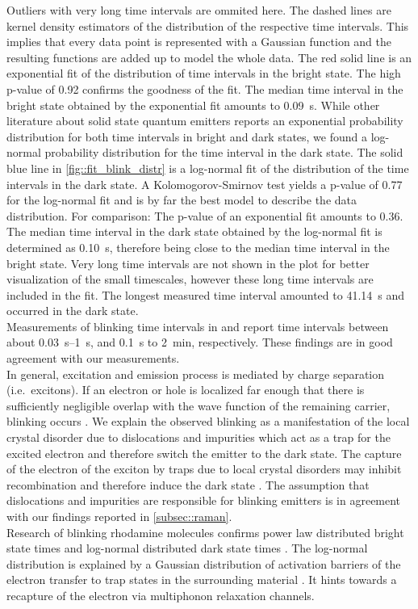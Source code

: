 		Outliers with very long time intervals are ommited here.
		The dashed lines are kernel density estimators of the distribution of the respective time intervals.
		This implies that every data point is represented with a Gaussian function and the resulting functions are added up to model the whole data.
		The red solid line is an exponential fit of the distribution of time intervals in the bright state.
		The high p-value of \num{0.92} confirms the goodness of the fit.
		The median time interval in the bright state obtained by the exponential fit amounts to \SI[separate-uncertainty]{0.09}{s}.
		While other literature about solid state quantum emitters reports an exponential probability distribution for both time intervals in bright and dark states\cite{Bradac2010,Berhane2017}, we found a log-normal probability distribution for the time interval in the dark state.
		The solid blue line in \cref{fig::fit_blink_distr} is a log-normal fit of the distribution of the time intervals in the dark state.
		A Kolomogorov-Smirnov test yields a p-value of \num{0.77} for the log-normal fit and is by far the best model to describe the data distribution.
		For comparison: The p-value of an exponential fit amounts to \num{0.36}.
		The median time interval in the dark state obtained by the log-normal fit is determined as \SI{0.10}{s}, therefore being close to the median time interval in the bright state.
		Very long time intervals are not shown in the plot for better visualization of the small timescales, however these long time intervals are included in the fit.
		The longest measured time interval amounted to \SI{41.14}{s} and occurred in the dark state.
		\\
		Measurements of blinking time intervals in \cite{Jantzen2016} and \cite{Neu2012a} report time intervals between about \SIrange{0.03}{1}{s}, and \SI{0.1}{s} to \SI{2}{min}, respectively.
		These findings are in good agreement with our measurements.
		\\
		In general, excitation and emission process is mediated by charge separation (i.e.\ excitons).
		If an electron or hole is localized far enough that there is sufficiently negligible overlap with the wave function of the remaining carrier, blinking occurs \cite{Efros2016}.
		We explain the observed blinking as a manifestation of the local crystal disorder due to dislocations and impurities which act as a trap for the excited electron and therefore switch the emitter to the dark state.
		The capture of the electron of the exciton by traps due to local crystal disorders may inhibit recombination and therefore induce the dark state \cite{Bradac2010}.
		The assumption that dislocations and impurities are responsible for blinking emitters is in agreement with our findings reported in \ref{subsec::raman}.
		\\
		Research of blinking rhodamine molecules confirms power law distributed bright state times and log-normal distributed dark state times \cite{Wong2013}.
		The log-normal distribution is explained by a Gaussian distribution of activation barriers of the electron transfer to trap states in the surrounding material \cite{Albery1985}.
		It hints towards a recapture of the electron via multiphonon relaxation channels.

